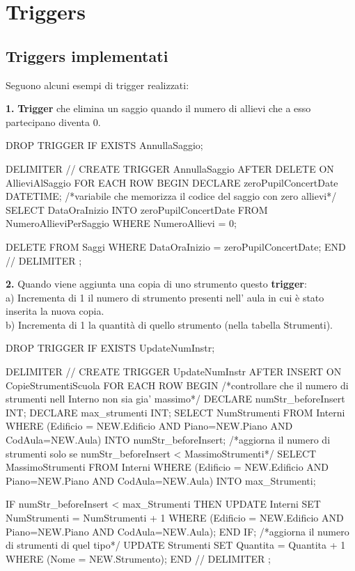 \documentclass{article}
\begin{document}
\newpage
\section{Triggers}

\subsection{Triggers implementati}

Seguono alcuni esempi di trigger realizzati:\bigskip

\begin{flushleft}
\textbf{1.} \textbf{Trigger} che elimina un saggio quando il numero di allievi che a esso partecipano diventa 0.
\end{flushleft}

\begin{sql}
DROP TRIGGER IF EXISTS AnnullaSaggio;

DELIMITER //
CREATE TRIGGER AnnullaSaggio
AFTER DELETE ON AllieviAlSaggio
FOR EACH ROW
BEGIN
       	DECLARE zeroPupilConcertDate DATETIME;       /*variabile che memorizza il codice del saggio con zero allievi*/
	SELECT DataOraInizio INTO zeroPupilConcertDate
        FROM NumeroAllieviPerSaggio 
	WHERE NumeroAllievi = 0;

 	DELETE FROM Saggi 
	WHERE DataOraInizio = zeroPupilConcertDate;	
END //
DELIMITER ;

\end{sql}

\bigskip

\begin{flushleft}
\textbf{2.} Quando viene aggiunta una copia di uno strumento questo \textbf{trigger}:\\
a) Incrementa di 1 il numero di strumento presenti nell' aula in cui è stato inserita la nuova copia.\\
b) Incrementa di 1 la quantità di quello strumento (nella tabella Strumenti).
\end{flushleft}

\begin{sql}
DROP TRIGGER IF EXISTS UpdateNumInstr;

DELIMITER //
CREATE TRIGGER UpdateNumInstr
AFTER INSERT ON CopieStrumentiScuola
FOR EACH ROW
BEGIN
	/*controllare che il numero di strumenti nell Interno non sia gia' massimo*/
	DECLARE numStr_beforeInsert INT;
	DECLARE max_strumenti INT;
	SELECT NumStrumenti FROM Interni 
	WHERE (Edificio = NEW.Edificio AND Piano=NEW.Piano AND CodAula=NEW.Aula) INTO numStr_beforeInsert;
	/*aggiorna il numero di strumenti solo se numStr_beforeInsert < MassimoStrumenti*/
	SELECT MassimoStrumenti FROM Interni
        WHERE (Edificio = NEW.Edificio AND Piano=NEW.Piano AND CodAula=NEW.Aula) INTO max_Strumenti;
	
	IF numStr_beforeInsert < max_Strumenti THEN
		UPDATE Interni
		SET NumStrumenti = NumStrumenti + 1
		WHERE (Edificio = NEW.Edificio AND Piano=NEW.Piano AND CodAula=NEW.Aula);
	END IF;	
	/*aggiorna il numero di strumenti di quel tipo*/
	UPDATE Strumenti
	SET Quantita = Quantita + 1
	WHERE (Nome = NEW.Strumento);
END //
DELIMITER ;
\end{sql}
\end{document}
